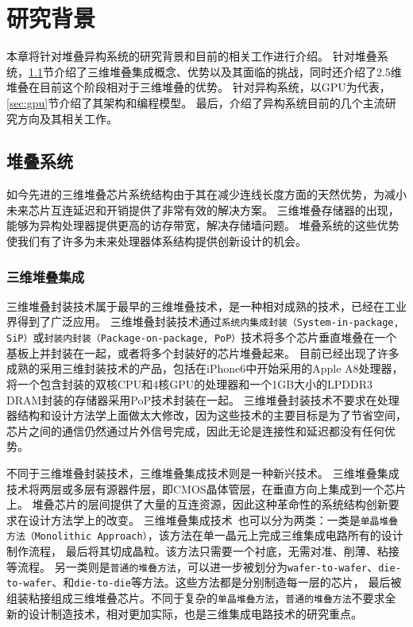 \chapter{研究背景}
\label{chap:background}

本章将针对堆叠异构系统的研究背景和目前的相关工作进行介绍。
针对堆叠系统，\ref{sec:stacking}节介绍了三维堆叠集成概念、优势以及其面临的挑战，同时还介绍了2.5维堆叠在目前这个阶段相对于三维堆叠的优势。
针对异构系统，以GPU为代表，\ref{sec:gpu}节介绍了其架构和编程模型。
最后，介绍了异构系统目前的几个主流研究方向及其相关工作。

\section{堆叠系统}
\label{sec:stacking}
如今先进的三维堆叠芯片系统结构由于其在减少连线长度方面的天然优势，为减小未来芯片互连延迟和开销提供了非常有效的解决方案。
三维堆叠存储器的出现，能够为异构处理器提供更高的访存带宽，解决存储墙问题。
堆叠系统的这些优势使我们有了许多为未来处理器体系结构提供创新设计的机会。

\subsection{三维堆叠集成}

三维堆叠封装技术属于最早的三维堆叠技术，是一种相对成熟的技术，已经在工业界得到了广泛应用。
三维堆叠封装技术通过\texttt{系统内集成封装（System-in-package, SiP）}或\texttt{封装内封装（Package-on-package, PoP）}技术将多个芯片垂直堆叠在一个基板上并封装在一起，或者将多个封装好的芯片堆叠起来。
目前已经出现了许多成熟的采用三维封装技术的产品，包括在iPhone6中开始采用的Apple A8处理器，
将一个包含封装的双核CPU和4核GPU的处理器和一个1GB大小的LPDDR3 DRAM封装的存储器采用PoP技术封装在一起。
三维堆叠封装技术不要求在处理器结构和设计方法学上面做太大修改，因为这些技术的主要目标是为了节省空间，
芯片之间的通信仍然通过片外信号完成，因此无论是连接性和延迟都没有任何优势。

不同于三维堆叠封装技术，三维堆叠集成技术则是一种新兴技术。
三维堆叠集成技术将两层或多层有源器件层，即CMOS晶体管层，在垂直方向上集成到一个芯片上。
堆叠芯片的层间提供了大量的互连资源，因此这种革命性的系统结构创新要求在设计方法学上的改变。
三维堆叠集成技术~也可以分为两类：一类是\texttt{单晶堆叠方法（Monolithic Approach）}，该方法在单一晶元上完成三维集成电路所有的设计制作流程，
最后将其切成晶粒。该方法只需要一个衬底，无需对准、削薄、粘接等流程。
另一类则是\texttt{普通的堆叠方法}，可以进一步被划分为\texttt{wafer-to-wafer}、\texttt{die-to-wafer}、和\texttt{die-to-die}等方法。这些方法都是分别制造每一层的芯片，
最后被组装粘接组成三维堆叠芯片。不同于复杂的\texttt{单晶堆叠方法}，\texttt{普通的堆叠方法}不要求全新的设计制造技术，相对更加实际，也是三维集成电路技术的研究重点。


